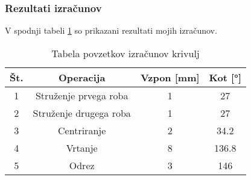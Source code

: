 \subsubsection{Rezultati izračunov}
V spodnji tabeli \ref{Tabela rezultatov} so prikazani
rezultati mojih izračunov.

\begin{table}[H]
	\caption{Tabela povzetkov izračunov krivulj}
	\label{Tabela rezultatov}
	\begin{center}
		\begin{tabular}{|c|c|c|c|}
			\hline
			Št. & Operacija              & Vzpon [mm] & Kot [°] \\
			\hline
			1   & Struženje prvega roba  & 1          & 27      \\
			\hline
			2   & Struženje drugega roba & 1          & 27      \\
			\hline
			3   & Centriranje            & 2          & 34.2    \\
			\hline
			4   & Vrtanje                & 8          & 136.8   \\
			\hline
			5   & Odrez                  & 3          & 146     \\
			\hline
		\end{tabular}
	\end{center}
\end{table}
